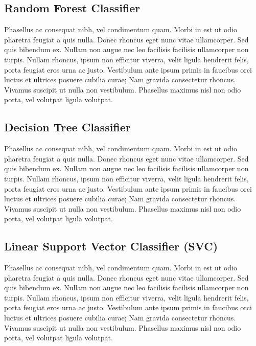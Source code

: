 \documentclass[
]{article}
\begin{document}
\hypertarget{random-forest-classifier}{%
\subsection{Random Forest Classifier}\label{random-forest-classifier}}

Phasellus ac consequat nibh, vel condimentum quam. Morbi in est ut odio
pharetra feugiat a quis nulla. Donec rhoncus eget nunc vitae
ullamcorper. Sed quis bibendum ex. Nullam non augue nec leo facilisis
facilisis ullamcorper non turpis. Nullam rhoncus, ipsum non efficitur
viverra, velit ligula hendrerit felis, porta feugiat eros urna ac justo.
Vestibulum ante ipsum primis in faucibus orci luctus et ultrices posuere
cubilia curae; Nam gravida consectetur rhoncus. Vivamus suscipit ut
nulla non vestibulum. Phasellus maximus nisl non odio porta, vel
volutpat ligula volutpat.

\hypertarget{decision-tree-classifier}{%
\subsection{Decision Tree Classifier}\label{decision-tree-classifier}}

Phasellus ac consequat nibh, vel condimentum quam. Morbi in est ut odio
pharetra feugiat a quis nulla. Donec rhoncus eget nunc vitae
ullamcorper. Sed quis bibendum ex. Nullam non augue nec leo facilisis
facilisis ullamcorper non turpis. Nullam rhoncus, ipsum non efficitur
viverra, velit ligula hendrerit felis, porta feugiat eros urna ac justo.
Vestibulum ante ipsum primis in faucibus orci luctus et ultrices posuere
cubilia curae; Nam gravida consectetur rhoncus. Vivamus suscipit ut
nulla non vestibulum. Phasellus maximus nisl non odio porta, vel
volutpat ligula volutpat.

\hypertarget{linear-support-vector-classifier-svc}{%
\subsection{Linear Support Vector Classifier
(SVC)}\label{linear-support-vector-classifier-svc}}

Phasellus ac consequat nibh, vel condimentum quam. Morbi in est ut odio
pharetra feugiat a quis nulla. Donec rhoncus eget nunc vitae
ullamcorper. Sed quis bibendum ex. Nullam non augue nec leo facilisis
facilisis ullamcorper non turpis. Nullam rhoncus, ipsum non efficitur
viverra, velit ligula hendrerit felis, porta feugiat eros urna ac justo.
Vestibulum ante ipsum primis in faucibus orci luctus et ultrices posuere
cubilia curae; Nam gravida consectetur rhoncus. Vivamus suscipit ut
nulla non vestibulum. Phasellus maximus nisl non odio porta, vel
volutpat ligula volutpat.
\end{document}
